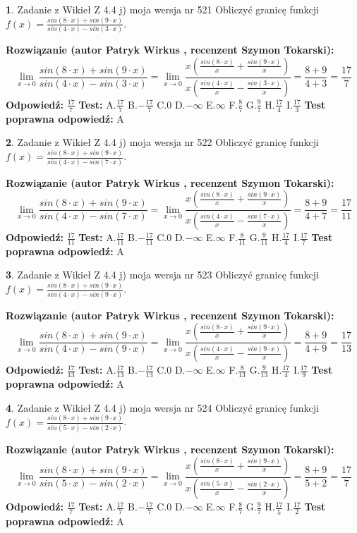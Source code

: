 \documentclass[12pt, a4paper]{article}
\theoremstyle{definition} %
\newtheorem{zad}{}
\newcommand{\zadStart}[1]{\begin{zad}#1\newline}
\newcommand{\zadStop}{\end{zad}}
\newcommand{\rozwStart}[2]{\noindent \textbf{Rozwiązanie (autor #1 , recenzent #2): }\newline}
\newcommand{\rozwStop}{\newline}
\newcommand{\odpStart}{\noindent \textbf{Odpowiedź:}\newline}
\newcommand{\odpStop}{\newline}
\newcommand{\testStart}{\noindent \textbf{Test:}\newline}
\newcommand{\testStop}{\newline}
\newcommand{\kluczStart}{\noindent \textbf{Test poprawna odpowiedź:}\newline}
\newcommand{\kluczStop}{\newline}
\begin{document}
\zadStart{Zadanie z Wikieł Z 4.4 j) moja wersja nr 521}
Obliczyć granicę funkcji $f(x)=\frac{sin(8\cdot x) +sin(9\cdot x)}{sin(4\cdot x) -sin(3\cdot x)}$.
\zadStop
\rozwStart{Patryk Wirkus}{Szymon Tokarski}
$$\lim\limits_{x\to 0}\frac{sin(8\cdot x) +sin(9\cdot x)}{sin(4\cdot x) -sin(3\cdot x)}=\lim\limits_{x\to 0}\frac{x(\frac{sin(8\cdot x)}{x}+\frac{sin(9\cdot x)}{x})}{x(\frac{sin(4\cdot x)}{x}-\frac{sin(3\cdot x)}{x})}=\frac{8+9}{4+3} = \frac{17}{7}$$
\rozwStop
\odpStart
$\frac{17}{7}$
\odpStop
\testStart
A.$\frac{17}{7}$
B.$-\frac{17}{7}$
C.$0$
D.$-\infty$
E.$\infty$
F.$\frac{8}{7}$
G.$\frac{9}{7}$
H.$\frac{17}{4}$
I.$\frac{17}{3}$
\testStop
\kluczStart
A
\kluczStop



\zadStart{Zadanie z Wikieł Z 4.4 j) moja wersja nr 522}
Obliczyć granicę funkcji $f(x)=\frac{sin(8\cdot x) +sin(9\cdot x)}{sin(4\cdot x) -sin(7\cdot x)}$.
\zadStop
\rozwStart{Patryk Wirkus}{Szymon Tokarski}
$$\lim\limits_{x\to 0}\frac{sin(8\cdot x) +sin(9\cdot x)}{sin(4\cdot x) -sin(7\cdot x)}=\lim\limits_{x\to 0}\frac{x(\frac{sin(8\cdot x)}{x}+\frac{sin(9\cdot x)}{x})}{x(\frac{sin(4\cdot x)}{x}-\frac{sin(7\cdot x)}{x})}=\frac{8+9}{4+7} = \frac{17}{11}$$
\rozwStop
\odpStart
$\frac{17}{11}$
\odpStop
\testStart
A.$\frac{17}{11}$
B.$-\frac{17}{11}$
C.$0$
D.$-\infty$
E.$\infty$
F.$\frac{8}{11}$
G.$\frac{9}{11}$
H.$\frac{17}{4}$
I.$\frac{17}{7}$
\testStop
\kluczStart
A
\kluczStop



\zadStart{Zadanie z Wikieł Z 4.4 j) moja wersja nr 523}
Obliczyć granicę funkcji $f(x)=\frac{sin(8\cdot x) +sin(9\cdot x)}{sin(4\cdot x) -sin(9\cdot x)}$.
\zadStop
\rozwStart{Patryk Wirkus}{Szymon Tokarski}
$$\lim\limits_{x\to 0}\frac{sin(8\cdot x) +sin(9\cdot x)}{sin(4\cdot x) -sin(9\cdot x)}=\lim\limits_{x\to 0}\frac{x(\frac{sin(8\cdot x)}{x}+\frac{sin(9\cdot x)}{x})}{x(\frac{sin(4\cdot x)}{x}-\frac{sin(9\cdot x)}{x})}=\frac{8+9}{4+9} = \frac{17}{13}$$
\rozwStop
\odpStart
$\frac{17}{13}$
\odpStop
\testStart
A.$\frac{17}{13}$
B.$-\frac{17}{13}$
C.$0$
D.$-\infty$
E.$\infty$
F.$\frac{8}{13}$
G.$\frac{9}{13}$
H.$\frac{17}{4}$
I.$\frac{17}{9}$
\testStop
\kluczStart
A
\kluczStop



\zadStart{Zadanie z Wikieł Z 4.4 j) moja wersja nr 524}
Obliczyć granicę funkcji $f(x)=\frac{sin(8\cdot x) +sin(9\cdot x)}{sin(5\cdot x) -sin(2\cdot x)}$.
\zadStop
\rozwStart{Patryk Wirkus}{Szymon Tokarski}
$$\lim\limits_{x\to 0}\frac{sin(8\cdot x) +sin(9\cdot x)}{sin(5\cdot x) -sin(2\cdot x)}=\lim\limits_{x\to 0}\frac{x(\frac{sin(8\cdot x)}{x}+\frac{sin(9\cdot x)}{x})}{x(\frac{sin(5\cdot x)}{x}-\frac{sin(2\cdot x)}{x})}=\frac{8+9}{5+2} = \frac{17}{7}$$
\rozwStop
\odpStart
$\frac{17}{7}$
\odpStop
\testStart
A.$\frac{17}{7}$
B.$-\frac{17}{7}$
C.$0$
D.$-\infty$
E.$\infty$
F.$\frac{8}{7}$
G.$\frac{9}{7}$
H.$\frac{17}{5}$
I.$\frac{17}{2}$
\testStop
\kluczStart
A
\kluczStop
\end{document}

